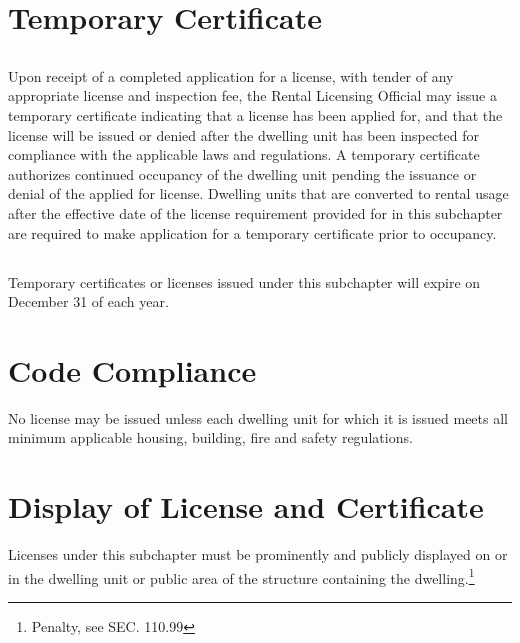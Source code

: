\section{Temporary Certificate}
\subsection{}
Upon receipt of a completed application for a license, with tender of any appropriate license and inspection fee, the Rental Licensing Official may issue a temporary certificate indicating that a license has been applied for, and that the license will be issued or denied after the dwelling unit has been inspected for compliance with the applicable laws and regulations.  A temporary certificate authorizes continued occupancy of the dwelling unit pending the issuance or denial of the applied for license.  Dwelling units that are converted to rental usage after the effective date of the license requirement provided for in this subchapter are required to make application for a temporary certificate prior to occupancy.
\subsection{}
Temporary certificates or licenses issued under this subchapter will expire on December 31 of each year.

\section{Code Compliance}
No license may be issued unless each dwelling unit for which it is issued meets all minimum applicable housing, building, fire and safety regulations.

\section{Display of License and Certificate}
Licenses under this subchapter must be prominently and publicly displayed on or in the dwelling unit or public area of the structure containing the dwelling.\footnote{Penalty, see SEC. 110.99}
